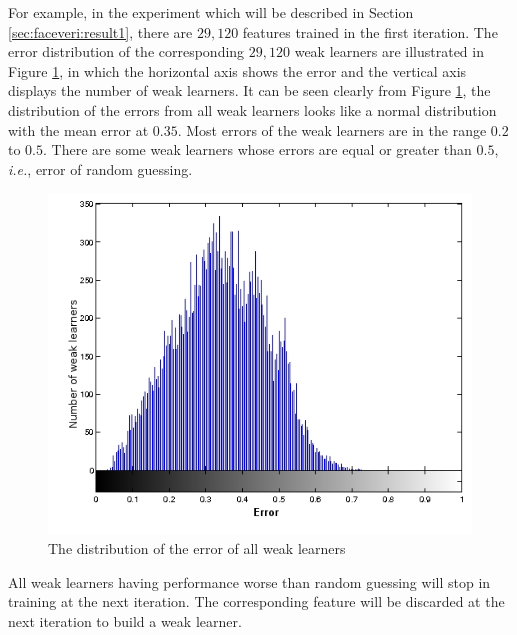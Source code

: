 For example, in the experiment which will be described in \mbox{Section} \ref{sec:faceveri:result1}, there are $29,120$ features trained in the first iteration. The error distribution of the corresponding $29,120$ weak learners are illustrated in \mbox{Figure} \ref{fig:disterrors}, in which the horizontal axis shows the error and the vertical axis displays the number of weak learners. It can be seen clearly from  \mbox{Figure} \ref{fig:disterrors}, the distribution of the errors from all weak learners looks like a normal distribution with the mean error at $0.35$. Most errors of the weak learners are in the range $0.2$ to $0.5$. There are some weak learners whose errors are equal or greater than $0.5$, \textit{i.e.}, error of random guessing.
 \begin{figure}[ht]
 \begin{center}
   \includegraphics[width=\columnwidth]{ch4/figures/disterrors.png}
  \caption{The distribution of the error of all weak learners}
 \label{fig:disterrors}
 \end{center}
 \end{figure} 
All weak learners having performance worse than random guessing will stop in training at the next iteration. The corresponding feature will be discarded at the next iteration to build a weak learner.

